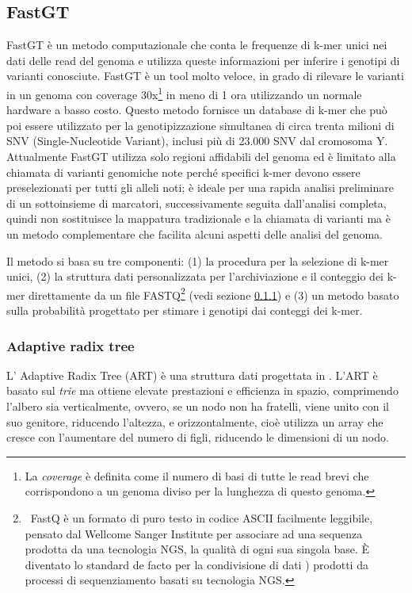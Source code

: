 \documentclass[../main.tex]{subfiles}
\begin{document}
\subsection{FastGT}
\label{fastgt}

FastGT \cite{pajuste2017fastgt} è un metodo computazionale che conta le frequenze di k-mer unici nei dati delle read del genoma e utilizza queste informazioni per inferire i genotipi di varianti conosciute. FastGT è un tool molto veloce, in grado di rilevare le varianti in un genoma con coverage 30x\footnote{La \textit{coverage} è definita come il numero di basi di tutte le read brevi che corrispondono a un genoma diviso per la lunghezza di questo genoma.} in meno di 1 ora utilizzando un normale hardware a basso costo. Questo metodo fornisce un database di k-mer che può poi essere utilizzato per la genotipizzazione simultanea di circa trenta milioni di SNV (Single-Nucleotide Variant), inclusi più di 23.000 SNV dal cromosoma Y. Attualmente FastGT utilizza solo regioni affidabili del genoma ed è limitato alla chiamata di varianti genomiche note perché specifici k-mer devono essere preselezionati per tutti gli alleli noti; è ideale per una rapida analisi preliminare di un sottoinsieme di marcatori, successivamente seguita dall'analisi completa, quindi non sostituisce la mappatura tradizionale e la chiamata di varianti ma è un metodo complementare che facilita alcuni aspetti delle analisi del genoma.

Il metodo si basa su tre componenti: (1) la procedura per la selezione di k-mer unici, (2) la struttura dati personalizzata per l'archiviazione e il conteggio dei k-mer direttamente da un file FASTQ\footnote{\ FastQ è un formato di puro testo in codice ASCII facilmente leggibile, pensato dal Wellcome Sanger Institute per associare ad una sequenza prodotta da una tecnologia NGS, la qualità di ogni sua singola base. È diventato lo standard de facto per la condivisione di dati \cite{cock2010sanger} \label{nota:FASTQ}) prodotti da processi di sequenziamento basati su tecnologia NGS.} (vedi sezione \ref{AdaptiveRadixTree}) e (3) un metodo basato sulla probabilità progettato per stimare i genotipi dai conteggi dei k-mer.

\subsubsection{Adaptive radix tree}
\label{AdaptiveRadixTree}

L' Adaptive Radix Tree (ART) è una struttura dati progettata in \cite{leis2013art}. L'ART è basato sul \textit{trie} ma ottiene elevate prestazioni e efficienza in spazio, comprimendo l'albero sia verticalmente, ovvero, se un nodo non ha fratelli, viene unito con il suo genitore, riducendo l'altezza, e orizzontalmente, cioè utilizza un array che cresce con l'aumentare del numero di figli, riducendo le dimensioni di un nodo.
\end{document}
